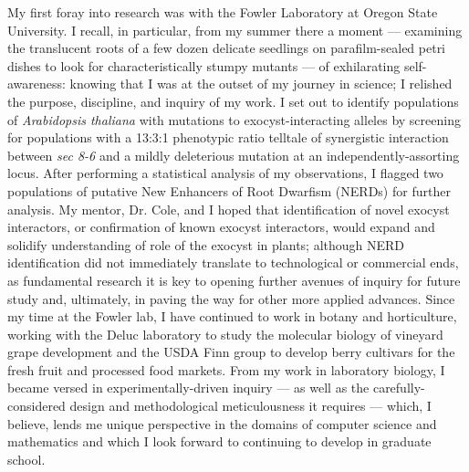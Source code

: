 \documentclass[12pt]{book}
\begin{document}
My first foray into research was with the Fowler Laboratory at Oregon State University. I recall, in particular, from my summer there a moment --- examining the translucent roots of a few dozen delicate seedlings on parafilm-sealed petri dishes to look for characteristically stumpy mutants --- of exhilarating self-awareness: knowing that I was at the outset of my journey in science; I relished the purpose, discipline, and inquiry of my work. I set out to identify populations of \textit{Arabidopsis thaliana} with mutations to exocyst-interacting alleles by screening for populations with a 13:3:1 phenotypic ratio telltale of synergistic interaction between \textit{sec 8-6} and a mildly deleterious mutation at an independently-assorting locus. After performing a statistical analysis of my observations, I flagged two populations of putative New Enhancers of Root Dwarfism (NERDs) for further analysis. My mentor, Dr. Cole, and I hoped that identification of novel exocyst interactors, or confirmation of known exocyst interactors, would expand and solidify understanding of role of the exocyst in plants; although NERD identification did not immediately translate to technological or commercial ends, as fundamental research it is key to opening further avenues of inquiry for future study and, ultimately, in paving the way for other more applied advances. Since my time at the Fowler lab, I have continued to work in botany and horticulture, working with the Deluc laboratory to study the molecular biology of vineyard grape development and the USDA Finn group to develop berry cultivars for the fresh fruit and processed food markets. From my work in laboratory biology, I became versed in experimentally-driven inquiry --- as well as the carefully-considered design and methodological meticulousness it requires --- which, I believe, lends me unique perspective in the domains of computer science and mathematics and which I look forward to continuing to develop in graduate school.
\end{document}
